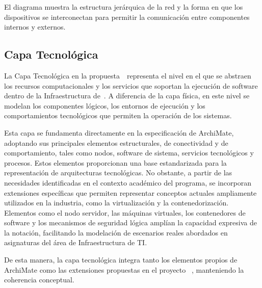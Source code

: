 \noindent
El diagrama muestra la estructura jerárquica de la red y la forma en que los dispositivos se interconectan para permitir la comunicación entre componentes internos y externos.


\subsection{Capa Tecnológica}
\noindent

La Capa Tecnológica en la propuesta~\NDITI~representa el nivel en el que se abstraen los recursos computacionales y los servicios que soportan la ejecución de software dentro de la Infraestructura de~\TI. A diferencia de la capa física, en este nivel se modelan los componentes lógicos, los entornos de ejecución y los comportamientos tecnológicos que permiten la operación de los sistemas.

Esta capa se fundamenta directamente en la especificación de ArchiMate, adoptando sus principales elementos estructurales, de conectividad y de comportamiento, tales como nodos, software de sistema, servicios tecnológicos y procesos. Estos elementos proporcionan una base estandarizada para la representación de arquitecturas tecnológicas. No obstante, a partir de las necesidades identificadas en el contexto académico del programa, se incorporan extensiones específicas que permiten representar conceptos actuales ampliamente utilizados en la industria, como la virtualización y la contenedorización. Elementos como el nodo servidor, las máquinas virtuales, los contenedores de software y los mecanismos de seguridad lógica amplían la capacidad expresiva de la notación, facilitando la modelación de escenarios reales abordados en asignaturas del área de Infraestructura de TI.

De esta manera, la capa tecnológica integra tanto los elementos propios de ArchiMate como las extensiones propuestas en el proyecto ~\NDITI{}, manteniendo la coherencia conceptual.

\renewcommand{\arraystretch}{1.3}
\setlength{\extrarowheight}{2pt}
\fontsize{8.5pt}{10pt}\selectfont


